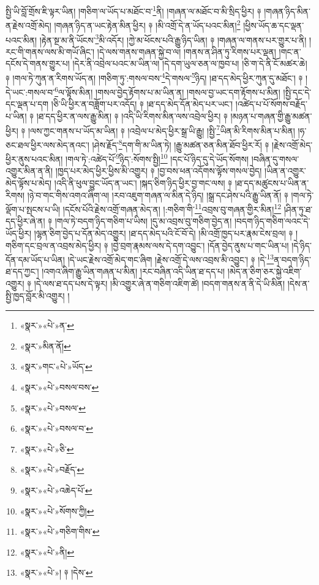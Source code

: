 སྤྱི་ཡི་བློ་གྲོས་ཇི་ལྟར་ཡིན། །གཅིག་ལ་ཡོད་པ་མཐོང་བ་\footnote{«སྣར་»«པེ་»ན་}ནི། །གཞན་ལ་མཐོང་བ་མི་སྲིད་ཕྱིར། ༈ །གཞན་ཉིད་མིན་ན་རྗེས་འགྲོ་མེད། །གཞན་ཉིད་ན་ཡང་རྟེན་མིན་ཕྱིར། ༈ །མི་འགྲོ་དེ་ན་ཡོད་པའང་མིན།\footnote{«སྣར་»མིན་ནོ།} །ཕྱིས་ཡོད་ཆ་དང་ལྡན་པའང་མིན། །རྟེན་སྔ་མ་ནི་ཡོངས་\footnote{«སྣར་»གང་«པེ་»ཡོད་}མི་འདོར། །ཀྱེ་མ་ཕོངས་པའི་རྒྱུ་ཉིད་ཡིན། ༈ །གཞན་ལ་གནས་པར་གྱུར་པ་ནི། །རང་གི་གནས་ལས་མི་གཡོ་ཞིང་། །དེ་ལས་གནས་གཞན་སྐྱེ་བ་ལ། །གནས་ན་ཤིན་ཏུ་རིགས་པར་ལྡན། །གང་ན་དངོས་དེ་གནས་གྱུར་པ། །དེར་ནི་འབྲེལ་པའང་མ་ཡིན་ལ། །དེ་དག་ཡུལ་ཅན་ལ་ཁྱབ་པ། །ཅི་ག་དེ་ནི་ངོ་མཚར་ཆེ། ༈ །གལ་ཏེ་ཀུན་ན་རིགས་ཡོད་ན། །གཅིག་ཏུ་:གསལ་བས་\footnote{«སྣར་»«པེ་»བསལ་བས་}དེ་གསལ་\footnote{«སྣར་»«པེ་»བསལ་}ཉིད། །ཐ་དད་མེད་ཕྱིར་ཀུན་དུ་མཐོང་། ༈ །དེ་ཡང་:གསལ་བ་\footnote{«སྣར་»«པེ་»བསལ་བ་}ལ་ལྟོས་མིན། །གསལ་བྱེད་རྟོགས་པ་མ་ཡིན་ན། །གསལ་བྱ་ཡང་དག་རྟོགས་པ་མིན། །སྤྱི་དང་དེ་དང་ལྡན་པ་དག །ཅི་ཡི་ཕྱིར་ན་བཟློག་པར་འདོད། ༈ །ཐ་དད་མེད་དོན་མེད་པར་ཡང་། །འཚེད་པ་པོ་སོགས་བརྗོད་པ་ཡིན། ༈ །ཐ་དད་ཕྱིར་ན་ལས་རྒྱུ་མིན། ༈ །འདི་ཡི་རིགས་མིན་ལས་འབྲེལ་ཕྱིར། ༈ །མཉན་པ་གཞན་གྱི་རྒྱུ་མཚན་ཕྱིར། ༈ །ལས་ཀྱང་གནས་པ་ཡོད་མ་ཡིན། ༈ །འབྲེལ་པ་མེད་ཕྱིར་སྒྲ་ཡི་རྒྱུ། །སྤྱི་\footnote{«སྣར་»«པེ་»ཅི་}ཡིན་མི་རིགས་མིན་པ་མིན། །ཧ་ཅང་ཐལ་ཕྱིར་ལས་མེད་ནའང་། །ཤེས་རྗོད་\footnote{«སྣར་»«པེ་»བརྗོད་}དག་གི་མ་ཡིན་ཏེ། །རྒྱུ་མཚན་ཅན་མིན་ཐོབ་ཕྱིར་རོ། ༈ །རྗེས་འགྲོ་མེད་ཕྱིར་ནུས་པའང་མིན། །གལ་ཏེ་:འཚེད་པོ་\footnote{«སྣར་»«པེ་»འཆེད་པོ་}ཉིད་:སོགས་སྤྱི།\footnote{«སྣར་»«པེ་»སོགས་ཀྱི།} །དང་པོ་ཉིད་དུ་དེ་ཡོད་སོགས། །བཞིན་དུ་གསལ་འགྱུར་མིན་ན་ནི། །ཁྱད་པར་མེད་ཕྱིར་ཕྱིས་མི་འགྱུར། ༈ །བྱ་བས་ཕན་འདོགས་ལྟོས་གསལ་བྱེད། །ཡིན་ན་འགྱུར་མེད་ལྟོས་པ་མེད། །འདི་ནི་ཕུལ་བྱུང་ཡོད་ན་ཡང་། །སྐད་ཅིག་ཉིད་ཕྱིར་བྱ་གང་ལས། ༈ །ཐ་དད་མཚུངས་པ་ཡིན་ན་རིགས། །ཉེ་བ་གང་གིས་འགའ་ཞིག་ལ། །རབ་འཇུག་གཞན་ལ་མིན་དེ་ཉིད། །སྒྲ་དང་ཤེས་པའི་རྒྱུ་ཡིན་ནོ། ༈ །གལ་ཏེ་ལྡོག་པ་སྤངས་པ་ཡི། །དངོས་པོའི་རྗེས་འགྲོ་གཞན་མེད་ན། །:གཅིག་གི་\footnote{«སྣར་»«པེ་»གཅིག་གིས་}འབྲས་བུ་གཞན་གྱིར་མིན།\footnote{«སྣར་»«པེ་»ནི།} །ཤིན་ཏུ་ཐ་དད་ཕྱིར་ཞེ་ན། ༈ །གལ་ཏེ་བདག་ཉིད་གཅིག་པ་ཡིས། །དུ་མ་འབྲས་བུ་གཅིག་བྱེད་ན། །བདག་ཉིད་གཅིག་ལའང་དེ་ཡོད་ཕྱིར། །ལྷན་ཅིག་བྱེད་པ་དོན་མེད་འགྱུར། །ཐ་དད་མེད་པའི་ངོ་བོ་དེ། །མི་འགྲོ་ཁྱད་པར་རྣམ་ངེས་བྲལ། ༈ །གཅིག་དང་བྲལ་ན་འབྲས་མེད་ཕྱིར། ༈ །བྱེ་བྲག་རྣམས་ལས་དེ་དག་འབྱུང་། །དོན་བྱེད་ནུས་པ་གང་ཡིན་པ། །དེ་ཉིད་དོན་དམ་ཡོད་པ་ཡིན། །དེ་ཡང་རྗེས་འགྲོ་མེད་གང་ཞིག །རྗེས་འགྲོ་དེ་ལས་འབྲས་མི་འབྱུང་། ༈ །དེ་\footnote{«སྣར་»«པེ་»། ༈ །དེས་}ན་བདག་ཉིད་ཐ་དད་ཀྱང་། །འགའ་ཞིག་རྒྱུ་ཡིན་གཞན་པ་མིན། །རང་བཞིན་འདི་ཡིན་ཐ་དད་པ། །མེད་ན་ཅིག་ཅར་སྐྱེ་འཇིག་འགྱུར། ༈ །དེ་ལས་ཐ་དད་པས་དེ་ལྟར། །མི་འགྱུར་ཞེ་ན་གཅིག་འཇིག་ཚེ། །བདག་གནས་ན་ནི་དེ་ཡི་མིན། །དེས་ན་སྤྱི་ཁྱད་བློར་མི་འགྱུར། །
